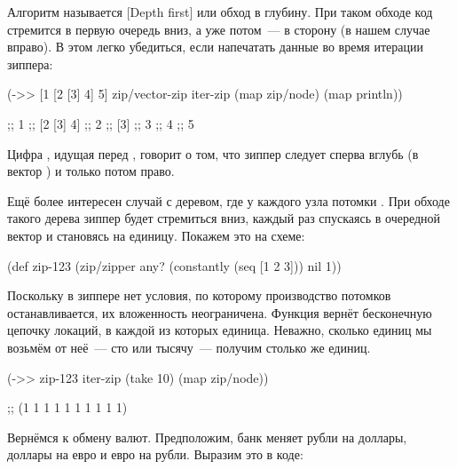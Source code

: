 Алгоритм называется [Depth first]
или обход в глубину. При таком обходе код стремится в первую очередь вниз, а уже
потом~--- в сторону (в нашем случае вправо). В этом легко убедиться, если
напечатать данные во время итерации зиппера:

\begin{english}
  \begin{clojure/lines}
(->> [1 [2 [3] 4] 5]
     zip/vector-zip
     iter-zip
     (map zip/node)
     (map println))

;; 1
;; [2 [3] 4]
;; 2
;; [3]
;; 3
;; 4
;; 5
  \end{clojure/lines}
\end{english}

Цифра , идущая перед  , говорит о том, что
зиппер следует сперва вглубь (в вектор \code{[3]}) и только потом право.

Ещё более интересен случай с деревом, где у каждого узла потомки \code{[1 2 3]}. При
обходе такого дерева зиппер будет стремиться вниз, каждый раз спускаясь в
очередной вектор \code{[1 2 3]} и становясь на единицу. Покажем это на схеме:

\begin{english}
  \begin{clojure}
(def zip-123
  (zip/zipper any?
              (constantly (seq [1 2 3]))
              nil
              1))
  \end{clojure}
\end{english}

\begin{figure}[H]
  \centering
  
  \label{fig:chart-zip-17}
\end{figure}

Поскольку в зиппере нет условия, по которому производство потомков
останавливается, их вложенность неограничена. Функция  вернёт
бесконечную цепочку локаций, в каждой из которых единица. Неважно, сколько
единиц мы возьмём от неё~--- сто или тысячу~--- получим столько же единиц.

\begin{english}
  \begin{clojure}
(->> zip-123
     iter-zip
     (take 10)
     (map zip/node))

;; (1 1 1 1 1 1 1 1 1 1)
  \end{clojure}
\end{english}

Вернёмся к обмену валют. Предположим, банк меняет рубли на доллары, доллары на
евро и евро на рубли. Выразим это в коде:

